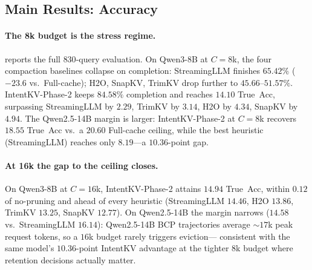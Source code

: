 \documentclass[11pt]{article}
\newcommand{\method}{IntentKV\xspace}
\newcommand{\learn}{Phase-2\xspace}
\begin{document}
\subsection{Main Results: Accuracy}
\label{sec:experiments-accuracy}

\paragraph{The 8k budget is the stress regime.}
 reports the full $830$-query evaluation.
On Qwen3-8B at $C{=}8$k, the four compaction baselines collapse on
completion: StreamingLLM finishes $65.42\%$ ($-23.6$ vs.\
Full-cache); H2O, SnapKV, TrimKV drop further to $45.66$--$51.57\%$.
\method-\learn keeps $84.58\%$ completion and reaches $14.10$
True~Acc, surpassing StreamingLLM by $2.29$, TrimKV by $3.14$, H2O
by $4.34$, SnapKV by $4.94$. The Qwen2.5-14B margin is larger:
\method-\learn at $C{=}8$k recovers $18.55$ True~Acc vs.\ a
$20.60$ Full-cache ceiling, while the best heuristic (StreamingLLM)
reaches only $8.19$—a $10.36$-point gap.

\paragraph{At 16k the gap to the ceiling closes.}
On Qwen3-8B at $C{=}16$k, \method-\learn attains $14.94$ True~Acc,
within $0.12$ of no-pruning and ahead of every heuristic
(StreamingLLM $14.46$, H2O $13.86$, TrimKV $13.25$, SnapKV $12.77$).
On Qwen2.5-14B the margin narrows ($14.58$ vs.\ StreamingLLM
$16.14$): Qwen2.5-14B BCP trajectories average $\sim$$17$k peak
request tokens, so a $16$k budget rarely triggers eviction—
consistent with the same model's $10.36$-point \method advantage at
the tighter $8$k budget where retention decisions actually matter.
\end{document}
